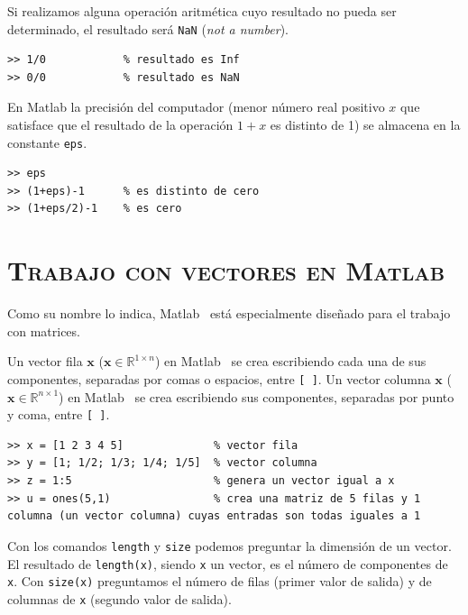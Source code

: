 \documentclass[letter,11pt]{article}
\newcommand\R{\mathbb{R}}
\newcommand\0{\mathbf{0}}
\newcommand{\matlab}{{\sc Matlab }}
\begin{document}
\medskip
	
	Si realizamos alguna operaci\'on aritm\'etica cuyo resultado no pueda ser determinado,
	el resultado ser\'a \Verb+NaN+ ({\em not a number}).

\medskip

\begin{lstlisting}
>> 1/0            % resultado es Inf
>> 0/0            % resultado es NaN
\end{lstlisting}

\medskip					

	En \matlab{} la precisi\'on del computador (menor n\'umero
	real positivo $x$ que satisface que el resultado de la operaci\'on $1+x$ es distinto de
	1) se almacena en la constante \Verb+eps+.

\medskip

\begin{lstlisting}
>> eps
>> (1+eps)-1      % es distinto de cero
>> (1+eps/2)-1    % es cero
\end{lstlisting}

\bigskip

\section{\textsc{Trabajo con vectores en \matlab}}

	Como su nombre lo indica, \matlab\, est\'a especialmente
	dise\~nado para el trabajo con matrices.
		
	Un vector fila $\boldsymbol{x}$ ($\boldsymbol{x} \in \R^{1\times n}$) en \matlab\, se crea escribiendo cada una de
	sus componentes, separadas por comas o espacios, entre \Verb+[ ]+.
	Un vector columna $\boldsymbol{x}$ ($\boldsymbol{x} \in \R^{n\times 1}$) en \matlab\, se crea escribiendo sus componentes,
	separadas por punto y coma, entre \Verb+[ ]+.
	
	\medskip

\begin{lstlisting}
>> x = [1 2 3 4 5]             	% vector fila						
>> y = [1; 1/2; 1/3; 1/4; 1/5] 	% vector columna						
>> z = 1:5                     	% genera un vector igual a x
>> u = ones(5,1)               	% crea una matriz de 5 filas y 1 columna (un vector columna) cuyas entradas son todas iguales a 1
\end{lstlisting}
\newpage

	Con los comandos \Verb+length+ y \Verb+size+ podemos preguntar la dimensi\'on de un vector.
	El resultado de \Verb+length(x)+, siendo \Verb+x+ un vector, es el n\'umero de componentes
	de \Verb+x+. Con \Verb+size(x)+ preguntamos el n\'umero de filas (primer valor de salida)
	y de columnas de \Verb+x+ (segundo valor de salida).
	
\end{document}
